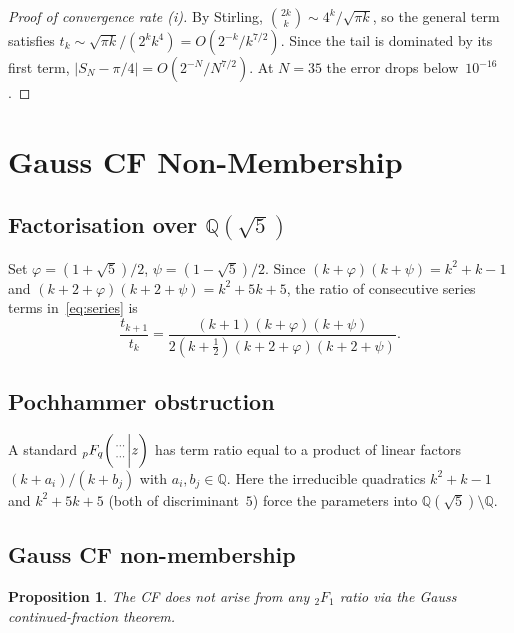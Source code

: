 \documentclass[11pt,a4paper]{article}
\theoremstyle{plain}
\newtheorem{proposition}[theorem]{Proposition}
\theoremstyle{definition}
\theoremstyle{remark}
\newcommand{\half}{\tfrac{1}{2}}
\newcommand{\hyp}[5]{{{}_{#1}F_{#2}}\!\left(\genfrac{}{}{0pt}{}{#3}{#4}\bigg|#5\right)}
\begin{document}
\begin{proof}[Proof of convergence rate \textup{(i)}]
By Stirling, $\binom{2k}{k} \sim 4^k/\sqrt{\pi k}$, so the
general term satisfies
$t_k \sim \sqrt{\pi k}/(2^k k^4) = O(2^{-k}/k^{7/2})$.
Since the tail is dominated by its first term,
$|S_N - \pi/4| = O(2^{-N}/N^{7/2})$.
At $N = 35$ the error drops below~$10^{-16}$.
\end{proof}

\section{Gauss CF Non-Membership}\label{sec:gauss}

\subsection{Factorisation over \texorpdfstring{$\mathbb{Q}(\sqrt{5})$}{Q(sqrt5)}}

Set $\varphi = (1{+}\sqrt{5})/2$, $\psi = (1{-}\sqrt{5})/2$.
Since $(k{+}\varphi)(k{+}\psi) = k^2{+}k{-}1$
and $(k{+}2{+}\varphi)(k{+}2{+}\psi) = k^2{+}5k{+}5$,
the ratio of consecutive series terms in~\eqref{eq:series} is
\begin{equation}\label{eq:ratio_hyp}
  \frac{t_{k+1}}{t_k}
  = \frac{(k{+}1)(k{+}\varphi)(k{+}\psi)}
         {2(k{+}\half)(k{+}2{+}\varphi)(k{+}2{+}\psi)}.
\end{equation}

\subsection{Pochhammer obstruction}

A standard $\hyp{p}{q}{\cdots}{\cdots}{z}$ has term ratio equal to
a product of linear factors $(k+a_i)/(k+b_j)$ with
$a_i,b_j\in\mathbb{Q}$.
Here the irreducible quadratics $k^2{+}k{-}1$ and $k^2{+}5k{+}5$
(both of discriminant~$5$) force the parameters into
$\mathbb{Q}(\sqrt5)\setminus\mathbb{Q}$.

\subsection{Gauss CF non-membership}

\begin{proposition}\label{prop:gauss}
The CF does not arise from any ${}_2F_1$ ratio via the Gauss
continued-fraction theorem.
\end{proposition}
\end{document}
